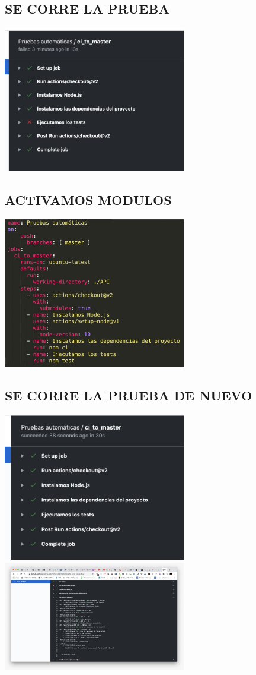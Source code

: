 \documentclass[twoside,twocolumn]{article}
\begin{document}
\subsection{ SE CORRE LA PRUEBA  }
\includegraphics[width=8cm]{./Imagenes/FALLA} 
\subsection{ ACTIVAMOS MODULOS }
\includegraphics[width=8cm]{./Imagenes/ACRIVE} 
\subsection{ SE CORRE LA PRUEBA DE NUEVO   }
\includegraphics[width=8cm]{./Imagenes/RESUELTO} 
\includegraphics[width=8cm]{./Imagenes/PRUEBAFINAL} 
\end{document}
